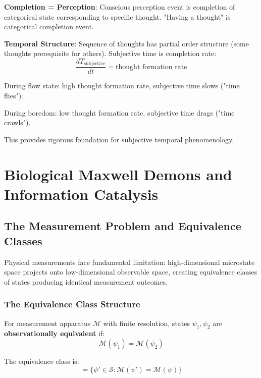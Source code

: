 \documentclass[11pt,onecolumn]{article}
\begin{document}
\textbf{Completion = Perception}: Conscious perception event is completion of categorical state corresponding to specific thought. "Having a thought" is categorical completion event.

\textbf{Temporal Structure}: Sequence of thoughts has partial order structure (some thoughts prerequisite for others). Subjective time is completion rate:
\begin{equation}
\frac{dT_{\text{subjective}}}{dt} = \text{thought formation rate}
\end{equation}

During flow state: high thought formation rate, subjective time slows ("time flies").

During boredom: low thought formation rate, subjective time drags ("time crawls").

This provides rigorous foundation for subjective temporal phenomenology.

\clearpage

\section{Biological Maxwell Demons and Information Catalysis}

\subsection{The Measurement Problem and Equivalence Classes}

Physical measurements face fundamental limitation: high-dimensional microstate space projects onto low-dimensional observable space, creating equivalence classes of states producing identical measurement outcomes.

\subsubsection{The Equivalence Class Structure}

\begin{definition}
For measurement apparatus $\mathcal{M}$ with finite resolution, states $\psi_1, \psi_2$ are \textbf{observationally equivalent} if:
\begin{equation}
\mathcal{M}(\psi_1) = \mathcal{M}(\psi_2)
\end{equation}

The equivalence class is:
\begin{equation}
[\psi] = \{\psi' \in \mathcal{S} : \mathcal{M}(\psi') = \mathcal{M}(\psi)\}
\end{equation}
\end{definition}
\end{document}
